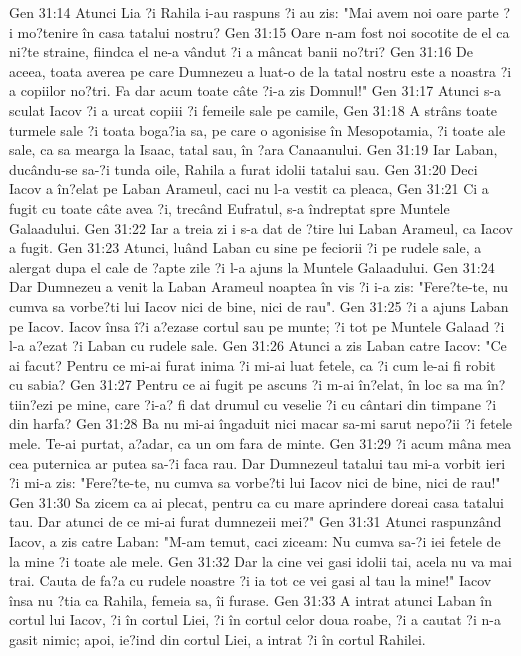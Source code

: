 Gen 31:14  Atunci Lia ?i Rahila i-au raspuns ?i au zis: "Mai avem noi oare parte ?i mo?tenire în casa tatalui nostru?
Gen 31:15  Oare n-am fost noi socotite de el ca ni?te straine, fiindca el ne-a vândut ?i a mâncat banii no?tri?
Gen 31:16  De aceea, toata averea pe care Dumnezeu a luat-o de la tatal nostru este a noastra ?i a copiilor no?tri. Fa dar acum toate câte ?i-a zis Domnul!"
Gen 31:17  Atunci s-a sculat Iacov ?i a urcat copiii ?i femeile sale pe camile,
Gen 31:18  A strâns toate turmele sale ?i toata boga?ia sa, pe care o agonisise în Mesopotamia, ?i toate ale sale, ca sa mearga la Isaac, tatal sau, în ?ara Canaanului.
Gen 31:19  Iar Laban, ducându-se sa-?i tunda oile, Rahila a furat idolii tatalui sau.
Gen 31:20  Deci Iacov a în?elat pe Laban Arameul, caci nu l-a vestit ca pleaca,
Gen 31:21  Ci a fugit cu toate câte avea ?i, trecând Eufratul, s-a îndreptat spre Muntele Galaadului.
Gen 31:22  Iar a treia zi i s-a dat de ?tire lui Laban Arameul, ca Iacov a fugit.
Gen 31:23  Atunci, luând Laban cu sine pe feciorii ?i pe rudele sale, a alergat dupa el cale de ?apte zile ?i l-a ajuns la Muntele Galaadului.
Gen 31:24  Dar Dumnezeu a venit la Laban Arameul noaptea în vis ?i i-a zis: "Fere?te-te, nu cumva sa vorbe?ti lui Iacov nici de bine, nici de rau".
Gen 31:25  ?i a ajuns Laban pe Iacov. Iacov însa î?i a?ezase cortul sau pe munte; ?i tot pe Muntele Galaad ?i l-a a?ezat ?i Laban cu rudele sale.
Gen 31:26  Atunci a zis Laban catre Iacov: "Ce ai facut? Pentru ce mi-ai furat inima ?i mi-ai luat fetele, ca ?i cum le-ai fi robit cu sabia?
Gen 31:27  Pentru ce ai fugit pe ascuns ?i m-ai în?elat, în loc sa ma în?tiin?ezi pe mine, care ?i-a? fi dat drumul cu veselie ?i cu cântari din timpane ?i din harfa?
Gen 31:28  Ba nu mi-ai îngaduit nici macar sa-mi sarut nepo?ii ?i fetele mele. Te-ai purtat, a?adar, ca un om fara de minte.
Gen 31:29  ?i acum mâna mea cea puternica ar putea sa-?i faca rau. Dar Dumnezeul tatalui tau mi-a vorbit ieri ?i mi-a zis: "Fere?te-te, nu cumva sa vorbe?ti lui Iacov nici de bine, nici de rau!"
Gen 31:30  Sa zicem ca ai plecat, pentru ca cu mare aprindere doreai casa tatalui tau. Dar atunci de ce mi-ai furat dumnezeii mei?"
Gen 31:31  Atunci raspunzând Iacov, a zis catre Laban: "M-am temut, caci ziceam: Nu cumva sa-?i iei fetele de la mine ?i toate ale mele.
Gen 31:32  Dar la cine vei gasi idolii tai, acela nu va mai trai. Cauta de fa?a cu rudele noastre ?i ia tot ce vei gasi al tau la mine!" Iacov însa nu ?tia ca Rahila, femeia sa, îi furase.
Gen 31:33  A intrat atunci Laban în cortul lui Iacov, ?i în cortul Liei, ?i în cortul celor doua roabe, ?i a cautat ?i n-a gasit nimic; apoi, ie?ind din cortul Liei, a intrat ?i în cortul Rahilei.
